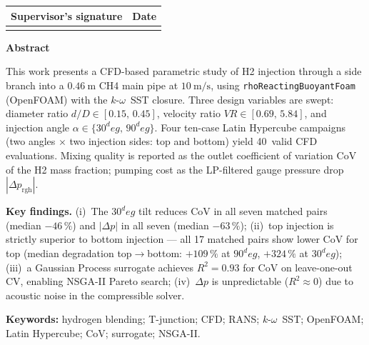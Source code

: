 \documentclass[10pt,a4paper]{article}
\def\Hi{H2}%
\def\CHi{CH4}%
\def\dD{d/D}%
\def\VR{VR}%
\def\CoV{CoV}%
\def\circ{ deg}%
\newcommand{\Hi}{\ensuremath{\mathrm{H_2}}}
\newcommand{\CHi}{\ensuremath{\mathrm{CH_4}}}
\newcommand{\dD}{\ensuremath{d/D}}
\newcommand{\VR}{\ensuremath{\mathrm{VR}}}
\newcommand{\CoV}{\ensuremath{\mathrm{CoV}}}
\begin{document}
\begin{titlepage}
    \vfill
    \renewcommand{\arraystretch}{1.2}
    \begin{tabular}{|p{}|p{}|}
        \hline
        \centering \textbf{Supervisor's signature} &
        \centering \textbf{Date} \tabularnewline
        \hline
        \vspace{0.8cm} & \vspace{0.8cm} \tabularnewline
        \hline
    \end{tabular}
    \vspace*{0.1cm}
\end{titlepage}

\begin{center}
    {\large \bfseries \sffamily Abstract}
\end{center}
\noindent
This work presents a CFD-based parametric study of \Hi{} injection
through a side branch into a \(\SI{0.46}{\meter}\) \CHi{} main pipe
at \(\SI{10}{\meter\per\second}\), using \texttt{rhoReactingBuoyantFoam}
(OpenFOAM) with the \(k\)-\(\omega\)~SST closure.  Three design
variables are swept: diameter ratio
\(\dD\in[0.15,\,0.45]\), velocity ratio
\(\VR\in[0.69,\,5.84]\), and injection angle
\(\alpha\in\{30^\circ,\,90^\circ\}\).  Four ten-case Latin Hypercube
campaigns (two angles \(\times\) two injection sides: top and bottom)
yield 40~valid CFD evaluations.  Mixing quality is reported as the
outlet coefficient of variation \CoV{} of the \Hi{} mass fraction;
pumping cost as the LP-filtered gauge pressure drop
\(|\Delta p_{\mathrm{rgh}}|\).

\textbf{Key findings.}
(i)~The \(30^\circ\) tilt reduces \CoV{} in all seven matched pairs
(median \(-46\,\%\)) and \(|\Delta p|\) in all seven (median
\(-63\,\%\)); (ii)~top injection is strictly superior to bottom
injection --- all 17 matched pairs show lower \CoV{} for top
(median degradation top\(\to\)bottom: \(+109\,\%\) at \(90^\circ\),
\(+324\,\%\) at \(30^\circ\)); (iii)~a Gaussian Process surrogate
achieves \(R^{2}=0.93\) for \CoV{} on leave-one-out CV, enabling
NSGA-II Pareto search; (iv)~\(\Delta p\) is unpredictable
(\(R^{2}\approx 0\)) due to acoustic noise in the compressible solver.

\vspace{0.5em}
\noindent
\textbf{Keywords:} hydrogen blending; T-junction; CFD; RANS;
\(k\)-\(\omega\)~SST; OpenFOAM; Latin Hypercube; CoV; surrogate; NSGA-II.
\end{document}
